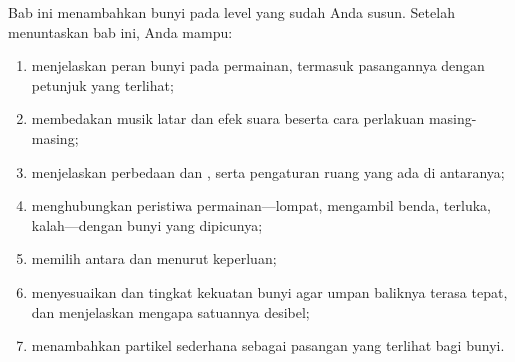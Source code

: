 \begin{tujuanbox}
Bab ini menambahkan bunyi pada level yang sudah Anda susun. Setelah
menuntaskan bab ini, Anda mampu:
\begin{enumerate}
  \item menjelaskan peran bunyi pada permainan, termasuk pasangannya dengan
        petunjuk yang terlihat;
  \item membedakan musik latar dan efek suara beserta cara perlakuan
        masing-masing;
  \item menjelaskan perbedaan  dan , serta
        pengaturan ruang yang ada di antaranya;
  \item menghubungkan peristiwa permainan---lompat, mengambil benda, terluka,
        kalah---dengan bunyi yang dipicunya;
  \item memilih antara  dan  menurut keperluan;
  \item menyesuaikan  dan tingkat kekuatan bunyi agar umpan
        baliknya terasa tepat, dan menjelaskan mengapa satuannya desibel;
  \item menambahkan partikel sederhana sebagai pasangan yang terlihat bagi
        bunyi.
\end{enumerate}
\end{tujuanbox}
